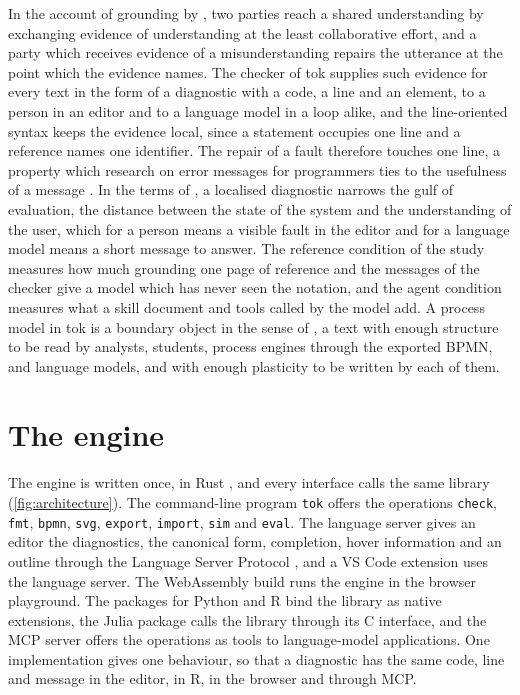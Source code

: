 \documentclass[11pt,a4paper]{article}
\begin{document}
In the account of grounding by \citet{ClarkBrennan1991}, two parties reach a shared understanding by exchanging evidence of understanding at the least collaborative effort, and a party which receives evidence of a misunderstanding repairs the utterance at the point which the evidence names. The checker of tok supplies such evidence for every text in the form of a diagnostic with a code, a line and an element, to a person in an editor and to a language model in a loop alike, and the line-oriented syntax keeps the evidence local, since a statement occupies one line and a reference names one identifier. The repair of a fault therefore touches one line, a property which research on error messages for programmers ties to the usefulness of a message \citep{Marceau2011measuring,Becker2019compiler}. In the terms of \citet{HutchinsHollanNorman1985}, a localised diagnostic narrows the gulf of evaluation, the distance between the state of the system and the understanding of the user, which for a person means a visible fault in the editor and for a language model means a short message to answer. The reference condition of the study measures how much grounding one page of reference and the messages of the checker give a model which has never seen the notation, and the agent condition measures what a skill document and tools called by the model add. A process model in tok is a boundary object in the sense of \citet{StarGriesemer1989}, a text with enough structure to be read by analysts, students, process engines through the exported BPMN, and language models, and with enough plasticity to be written by each of them.

\section{The engine}\label{sec:engine}

The engine is written once, in Rust \citep{Matsakis2014rust}, and every interface calls the same library (\cref{fig:architecture}). The command-line program \texttt{tok} offers the operations \texttt{check}, \texttt{fmt}, \texttt{bpmn}, \texttt{svg}, \texttt{export}, \texttt{import}, \texttt{sim} and \texttt{eval}. The language server gives an editor the diagnostics, the canonical form, completion, hover information and an outline through the Language Server Protocol \citep{Microsoft2022lsp}, and a VS Code extension uses the language server. The WebAssembly build \citep{Haas2017webassembly} runs the engine in the browser playground. The packages for Python and R bind the library as native extensions, the Julia package calls the library through its C interface, and the MCP server offers the operations as tools to language-model applications. One implementation gives one behaviour, so that a diagnostic has the same code, line and message in the editor, in R, in the browser and through MCP.
\end{document}
